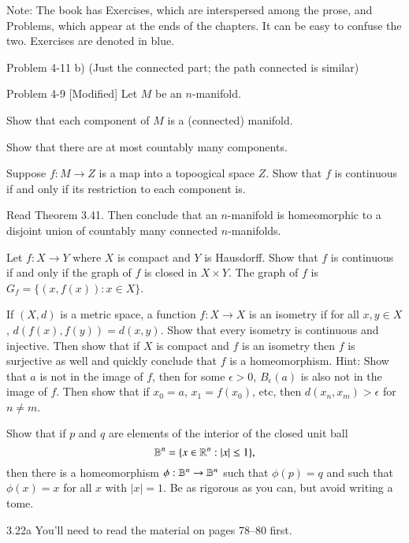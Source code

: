 \documentclass[minion]{homework651}
\begin{document}
Note: The book has Exercises, which are interspersed among the
prose, and Problems, which appear at the ends of the chapters.
It can be easy to confuse the two.  Exercises are denoted in blue.


\begin{problems}


\problem Problem 4-11 b) (Just the connected part; the path connected is similar)

\problem Problem 4-9 [Modified]
Let $M$ be an $n$-manifold.
\begin{subproblems}
\item Show that each component of $M$ is a (connected) manifold.
\item Show that there are at most countably many components.
\item Suppose $f:M\to Z$ is a map into a topoogical space $Z$. Show
that $f$ is continuous if and only if its restriction to each component is.
\item Read Theorem 3.41.  Then conclude that an $n$-manifold is homeomorphic
to a disjoint union of countably many connected $n$-manifolds.
\end{subproblems}

\problem Let $f:X\rightarrow Y$ where $X$ is compact and $Y$ is Hausdorff.  Show that
$f$ is continuous if and only if the graph of $f$ is closed in $X\times Y$.  The graph
of $f$ is $G_f=\{(x,f(x)):x\in X\}$.

\problem If $(X,d)$ is a metric space, a function $f:X\rightarrow X$ is an isometry if
for all $x,y\in X$, $d(f(x),f(y))=d(x,y)$.  Show that every isometry is continuous and injective.
Then show that if  $X$ is compact and $f$ is an isometry 
then $f$ is surjective  as well and quickly conclude that $f$ is a homeomorphism. Hint:
Show that $a$ is not in the image of $f$, then for some $\epsilon>0$, $B_\epsilon(a)$
is also not in the image of $f$.  Then show that if $x_0=a$, $x_1=f(x_0)$, etc, then 
$d(x_n,x_m)>\epsilon$ for $n\neq m$.

\problem Show that if $p$ and $q$ are elements of the interior of the closed unit ball 
$$
\mathbb B^n=\{x\in \mathbb R^n:|x|\le 1\},
$$
then there is a homeomorphism $\phi:\mathbb B^n\rightarrow \mathbb B^n$ such that $\phi(p)=q$ and such that $\phi(x)=x$ for all $x$
with $|x|=1$.  Be as rigorous as you can, but avoid writing a tome.

\problem 3.22a You'll need to read the material on pages 78--80 first.

\end{problems}
\end{document}
